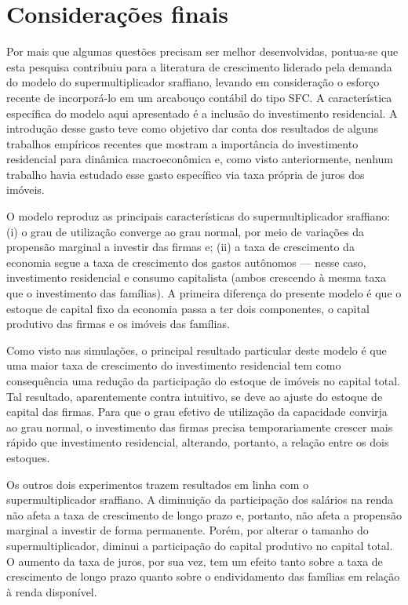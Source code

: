 \section{Considerações finais}\label{Conclusao_Modelo}

Por mais que algumas questões precisam ser melhor desenvolvidas, pontua-se que 
esta pesquisa contribuiu para a literatura de crescimento liderado pela demanda do modelo do supermultiplicador sraffiano, levando em consideração o esforço recente de incorporá-lo em um arcabouço contábil do tipo SFC.  A característica específica do modelo aqui apresentado é a inclusão do investimento residencial. A introdução desse gasto teve como objetivo dar conta dos resultados de alguns trabalhos empíricos recentes que mostram a importância do investimento residencial para dinâmica macroeconômica e, como visto anteriormente, nenhum trabalho havia estudado esse gasto específico via taxa própria de juros dos imóveis. 

O modelo reproduz as principais características do supermultiplicador sraffiano: (i) o grau de utilização converge ao grau normal, por meio de variações da propensão marginal a investir das firmas e; (ii) a taxa de crescimento da economia segue a taxa de crescimento dos gastos autônomos --- nesse caso, investimento residencial e consumo capitalista (ambos crescendo à mesma taxa que o investimento das famílias). A primeira diferença do  presente modelo é que o estoque de capital fixo da economia passa a ter dois componentes, o capital produtivo das firmas e os imóveis das famílias. 

Como visto nas simulações, o principal resultado particular deste modelo é que uma maior taxa de crescimento do investimento residencial tem como consequência uma redução da participação do estoque de imóveis no capital total. Tal resultado, aparentemente contra intuitivo, se deve ao ajuste do estoque de capital das firmas. Para que o grau efetivo de utilização da capacidade convirja ao grau normal, o investimento das firmas precisa temporariamente crescer mais rápido que investimento residencial, alterando, portanto, a relação entre os dois estoques. 

Os outros dois experimentos trazem resultados em linha com o supermultiplicador sraffiano. A diminuição da participação dos salários na renda não afeta a taxa de crescimento de longo prazo e, portanto, não afeta a propensão marginal a investir de forma permanente. Porém, por alterar o tamanho do supermultiplicador, diminui a participação do capital produtivo no capital total. O aumento da taxa de juros, por sua vez, tem um efeito tanto sobre a taxa de crescimento de longo prazo quanto sobre o endividamento das famílias em relação à renda disponível. 

